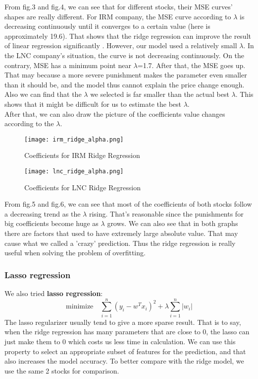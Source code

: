 \documentclass[fleqn,10pt]{SelfArx} %
\begin{document}
\noindent
From fig.3 and fig.4, we can see that for different stocks, their MSE curves' shapes are really different. For IRM company, the MSE curve according to $\lambda$ is decreasing continuously until it converges to a certain value (here is approximately 19.6). That shows that the ridge regression can improve the result of linear regression significantly . However, our model used a relatively small $\lambda$. In the LNC company's situation, the curve is not decreasing continuously. On the contrary, MSE has a minimum point near $\lambda$=1.7. After that, the MSE goes up. That may because a more severe punishment makes the parameter even smaller than it should be, and the model thus cannot explain the price change enough. Also we can find that the $\lambda$ we selected is far smaller than the actual best $\lambda$. This shows that it might be difficult for us to estimate the best $\lambda$.\\
\newline
\noindent
After that, we can also draw the picture of the coefficients value changes according to the $\lambda$.\\

\begin{figure}[ht]\centering %
\texttt{[image: irm\_ridge\_alpha.png]}
\caption{Coefficients for IRM Ridge Regression}
\label{fig:view}
\end{figure}

\begin{figure}[ht]\centering %
\texttt{[image: lnc\_ridge\_alpha.png]}
\caption{Coefficients for LNC Ridge Regression}
\label{fig:view}
\end{figure}
\noindent
From fig.5 and fig.6, we can see that most of the coefficients of both stocks follow a decreasing trend as the $\lambda$ rising. That's reasonable since the punishments for big coefficients become huge as $\lambda$ grows. We can also see that in both graphs there are factors that used to have extremely large absolute value. That may cause what we called a 'crazy' prediction. Thus the ridge regression is really useful when solving the problem of overfitting.

\subsubsection{Lasso regression}
\noindent
We also tried \textbf{lasso regression}:
$$ \text{minimize} \quad \sum_{i=1}^{n} (y_i - w^Tx_i)^2 + \lambda \sum_{i=1}^{n} |w_i|$$
The lasso regularizer usually tend to give a more sparse result. That is to say, when the ridge regression has many parameters that are close to 0, the lasso can just make them to 0 which costs us less time in calculation. We can use this property to select an appropriate subset of features for the prediction, and that also increases the model accuracy. To better compare with the ridge model, we use the same 2 stocks for comparison.\\
\end{document}
